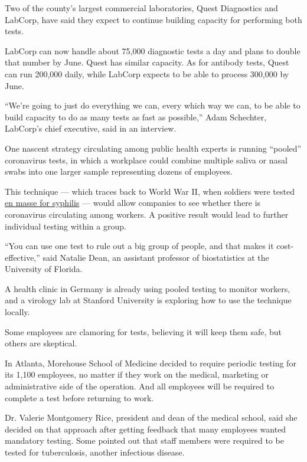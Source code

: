 Two of the county's largest commercial laboratories, Quest Diagnostics
and LabCorp, have said they expect to continue building capacity for
performing both tests.

LabCorp can now handle about 75,000 diagnostic tests a day and plans to
double that number by June. Quest has similar capacity. As for antibody
tests, Quest can run 200,000 daily, while LabCorp expects to be able to
process 300,000 by June.

``We're going to just do everything we can, every which way we can, to
be able to build capacity to do as many tests as fast as possible,''
Adam Schechter, LabCorp's chief executive, said in an interview.

One nascent strategy circulating among public health experts is running
``pooled'' coronavirus tests, in which a workplace could combine
multiple saliva or nasal swabs into one larger sample representing
dozens of employees.

This technique --- which traces back to World War II, when soldiers were
tested
\href{https://www.semanticscholar.org/paper/The-Detection-of-Defective-Members-of-Large-Dorfman/3226748e9905a4ad5174c7a3fad2fccf1abfa105}{en
masse for syphilis} --- would allow companies to see whether there is
coronavirus circulating among workers. A positive result would lead to
further individual testing within a group.

``You can use one test to rule out a big group of people, and that makes
it cost-effective,'' said Natalie Dean, an assistant professor of
biostatistics at the University of Florida.

A health clinic in Germany is already using pooled testing to monitor
workers, and a virology lab at Stanford University is exploring how to
use the technique locally.

Some employees are clamoring for tests, believing it will keep them
safe, but others are skeptical.

In Atlanta, Morehouse School of Medicine decided to require periodic
testing for its 1,100 employees, no matter if they work on the medical,
marketing or administrative side of the operation. And all employees
will be required to complete a test before returning to work.

Dr. Valerie Montgomery Rice, president and dean of the medical school,
said she decided on that approach after getting feedback that many
employees wanted mandatory testing. Some pointed out that staff members
were required to be tested for tuberculosis, another infectious disease.

